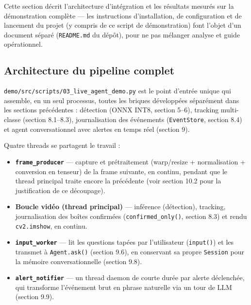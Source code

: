 \documentclass[11pt,a4paper]{article}
\let\Oldsubsection\subsection
\renewcommand{\subsection}{\FloatBarrier\Oldsubsection}
\begin{document}
    Cette section décrit l'architecture d'intégration et les résultats
    mesurés sur la démonstration complète --- les instructions
    d'installation, de configuration et de lancement du projet (y compris
    de ce script de démonstration) font l'objet d'un document séparé
    (\texttt{README.md} du dépôt), pour ne pas mélanger analyse et guide
    opérationnel.
    
    \subsection{Architecture du pipeline complet}
    
    \texttt{demo/src/scripts/03\_live\_agent\_demo.py} est le point d'entrée unique
    qui assemble, en un seul processus, toutes les briques développées
    séparément dans les sections précédentes : détection (ONNX INT8,
    section 5--6), tracking multi-classe (section 8.1--8.3), journalisation
    des événements (\texttt{EventStore}, section 8.4) et agent
    conversationnel avec alertes en temps réel (section 9).
    
    Quatre threads se partagent le travail :
    
    \begin{itemize}[leftmargin=1.5em]
      \item \textbf{\texttt{frame\_producer}} --- capture et prétraitement
        (warp/resize + normalisation + conversion en tenseur) de la frame
        suivante, en continu, pendant que le thread principal traite encore
        la précédente (voir section 10.2 pour la justification de ce
        découpage).
      \item \textbf{Boucle vidéo (thread principal)} --- inférence
        (détection), tracking, journalisation des boîtes confirmées
        (\texttt{confirmed\_only()}, section 8.3) et rendu
        \texttt{cv2.imshow}, en continu.
      \item \textbf{\texttt{input\_worker}} --- lit les questions tapées
        par l'utilisateur (\texttt{input()}) et les transmet à
        \texttt{Agent.ask()} (section 9.6), en conservant sa propre
        \texttt{Session} pour la mémoire conversationnelle (section 9.8).
      \item \textbf{\texttt{alert\_notifier}} --- un thread daemon
        de courte durée par alerte déclenchée, qui transforme l'événement
        brut en phrase naturelle via un tour de LLM (section 9.9).
    \end{itemize}
    
\end{document}
